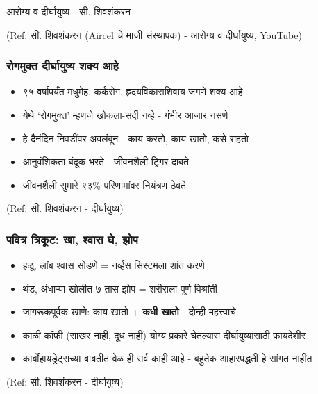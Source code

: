 \begin{frame}[fragile]\frametitle{}
\begin{center}
{\Large आरोग्य व दीर्घायुष्य - सी. शिवशंकरन}
\end{center}

{\tiny (Ref: सी. शिवशंकरन (Aircel चे माजी संस्थापक) - आरोग्य व दीर्घायुष्य, YouTube)}

\end{frame}

\begin{frame}[fragile]\frametitle{रोगमुक्त दीर्घायुष्य शक्य आहे}

	\begin{itemize}
	\item ९५ वर्षापर्यंत मधुमेह, कर्करोग, हृदयविकाराशिवाय जगणे शक्य आहे
	\item येथे `रोगमुक्त' म्हणजे खोकला-सर्दी नव्हे - गंभीर आजार नसणे
	\item हे दैनंदिन निवडींवर अवलंबून - काय करतो, काय खातो, कसे राहतो
	\item आनुवंशिकता बंदूक भरते - जीवनशैली ट्रिगर दाबते
	\item जीवनशैली सुमारे ९३\% परिणामांवर नियंत्रण ठेवते
	\end{itemize}

{\tiny (Ref: सी. शिवशंकरन - दीर्घायुष्य)}

\end{frame}

\begin{frame}[fragile]\frametitle{पवित्र त्रिकूट: खा, श्वास घे, झोप}

	\begin{itemize}
	\item हळू, लांब श्वास सोडणे = नर्व्हस सिस्टमला शांत करणे
	\item थंड, अंधाऱ्या खोलीत ७ तास झोप = शरीराला पूर्ण विश्रांती
	\item जागरूकपूर्वक खाणे: काय खातो + \textbf{कधी खातो} - दोन्ही महत्त्वाचे
	\item काळी कॉफी (साखर नाही, दूध नाही) योग्य प्रकारे घेतल्यास दीर्घायुष्यासाठी फायदेशीर
	\item कार्बोहायड्रेट्सच्या बाबतीत वेळ ही सर्व काही आहे - बहुतेक आहारपद्धती हे सांगत नाहीत
	\end{itemize}

{\tiny (Ref: सी. शिवशंकरन - दीर्घायुष्य)}

\end{frame}

